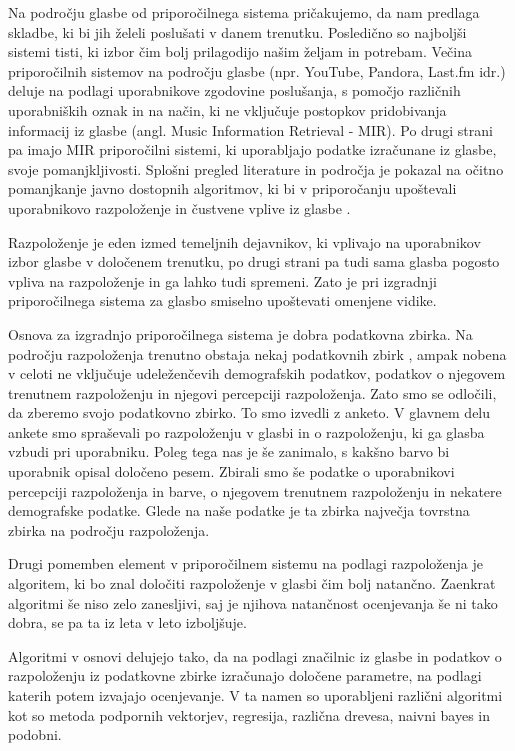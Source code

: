 \documentclass[a4paper, 12pt]{book}
\begin{document}
{Na področju glasbe od priporočilnega sistema pričakujemo, da nam predlaga skladbe, ki bi jih želeli poslušati v danem trenutku. Posledično so najboljši sistemi tisti, ki izbor čim bolj prilagodijo našim željam in potrebam. Večina priporočilnih sistemov na področju glasbe (npr. YouTube, Pandora, Last.fm idr.) deluje na podlagi uporabnikove zgodovine poslušanja, s pomočjo različnih uporabniških oznak in na način, ki ne vključuje postopkov pridobivanja informacij iz glasbe (angl. Music Information Retrieval - MIR). Po drugi strani pa imajo MIR priporočilni sistemi, ki uporabljajo podatke izračunane iz glasbe, svoje pomanjkljivosti. Splošni pregled literature in področja je pokazal na očitno pomanjkanje javno dostopnih algoritmov, ki bi v priporočanju upoštevali uporabnikovo razpoloženje in čustvene vplive iz glasbe \cite{JaeSikLee2006, Song2012, chen2001music}.  

Razpoloženje je eden izmed temeljnih dejavnikov, ki vplivajo na uporabnikov izbor glasbe v določenem trenutku, po drugi strani pa tudi sama glasba pogosto vpliva na razpoloženje in ga lahko tudi spremeni. Zato je pri izgradnji priporočilnega sistema za glasbo smiselno upoštevati omenjene vidike.

Osnova za izgradnjo priporočilnega sistema je dobra podatkovna zbirka. Na področju razpoloženja trenutno obstaja nekaj podatkovnih zbirk \cite{Eerola2010, schmidt2011modeling, turnbull2008semantic, schuller2010mister, panda2013multi}, ampak nobena v celoti ne vključuje udeleženčevih demografskih podatkov, podatkov o njegovem trenutnem razpoloženju in njegovi percepciji razpoloženja. Zato smo se odločili, da zberemo svojo podatkovno zbirko. To smo izvedli z anketo. V glavnem delu ankete smo spraševali po razpoloženju v glasbi in o razpoloženju, ki ga glasba vzbudi pri uporabniku. Poleg tega nas je še zanimalo, s kakšno barvo bi uporabnik opisal določeno pesem. Zbirali smo še podatke o uporabnikovi percepciji razpoloženja in barve, o njegovem trenutnem razpoloženju in nekatere demografske podatke. Glede na naše podatke je ta zbirka največja tovrstna zbirka na področju razpoloženja. 

Drugi pomemben element v priporočilnem sistemu na podlagi razpoloženja je algoritem, ki bo znal določiti razpoloženje v glasbi čim bolj natančno. Zaenkrat algoritmi še niso zelo zanesljivi, saj je njihova natančnost ocenjevanja še ni tako dobra, se pa ta iz leta v leto izboljšuje. 

Algoritmi v osnovi delujejo tako, da na podlagi značilnic iz glasbe in podatkov o razpoloženju iz podatkovne zbirke izračunajo določene parametre, na podlagi katerih potem izvajajo ocenjevanje. V ta namen so uporabljeni različni algoritmi kot so metoda podpornih vektorjev, regresija, različna drevesa, naivni bayes in podobni. 

}
\end{document}
